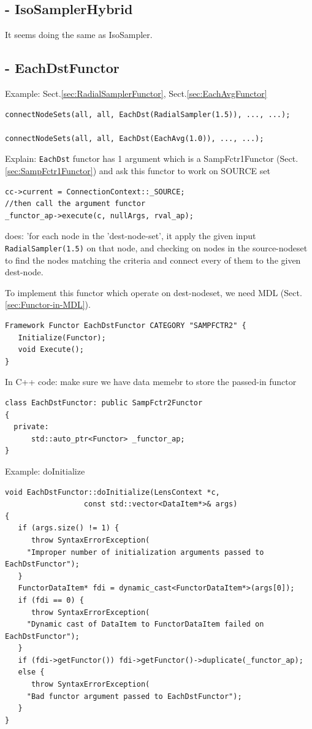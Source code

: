 \subsection{- IsoSamplerHybrid}
\label{sec:IsoSamplerHybrid}

It seems doing the same as IsoSampler. 

\subsection{- EachDstFunctor}
\label{sec:EachDstFunctor}

Example: Sect.\ref{sec:RadialSamplerFunctor}, Sect.\ref{sec:EachAvgFunctor}
\begin{verbatim}
connectNodeSets(all, all, EachDst(RadialSampler(1.5)), ..., ...);

connectNodeSets(all, all, EachDst(EachAvg(1.0)), ..., ...);
\end{verbatim}

Explain: \verb!EachDst! functor has 1 argument which is a SampFctr1Functor
(Sect.\ref{sec:SampFctr1Functor}) and ask this functor to work on SOURCE set
\begin{verbatim}
cc->current = ConnectionContext::_SOURCE;
//then call the argument functor
_functor_ap->execute(c, nullArgs, rval_ap);
\end{verbatim}

does: 'for each node in the 'dest-node-set', it
apply the given input \verb!RadialSampler(1.5)! on that node, and checking
on nodes in the source-nodeset to find the nodes matching the criteria and
connect every of them to the given dest-node.

To implement this functor which operate on dest-nodeset, we need MDL
(Sect.\ref{sec:Functor-in-MDL}).
\begin{verbatim}
Framework Functor EachDstFunctor CATEGORY "SAMPFCTR2" {
   Initialize(Functor);
   void Execute();
}
\end{verbatim}

In C++ code: make sure we have data memebr to store the passed-in functor
{\tiny
\begin{verbatim}
class EachDstFunctor: public SampFctr2Functor
{
  private:
      std::auto_ptr<Functor> _functor_ap;
}
\end{verbatim}
}

Example: doInitialize
{\tiny
\begin{lstlisting}
void EachDstFunctor::doInitialize(LensContext *c, 
				  const std::vector<DataItem*>& args)
{
   if (args.size() != 1) {
      throw SyntaxErrorException(
	 "Improper number of initialization arguments passed to EachDstFunctor");
   }
   FunctorDataItem* fdi = dynamic_cast<FunctorDataItem*>(args[0]);
   if (fdi == 0) {
      throw SyntaxErrorException(
	 "Dynamic cast of DataItem to FunctorDataItem failed on EachDstFunctor");
   }
   if (fdi->getFunctor()) fdi->getFunctor()->duplicate(_functor_ap);
   else {
      throw SyntaxErrorException(
	 "Bad functor argument passed to EachDstFunctor");
   }
}
\end{lstlisting}
}

